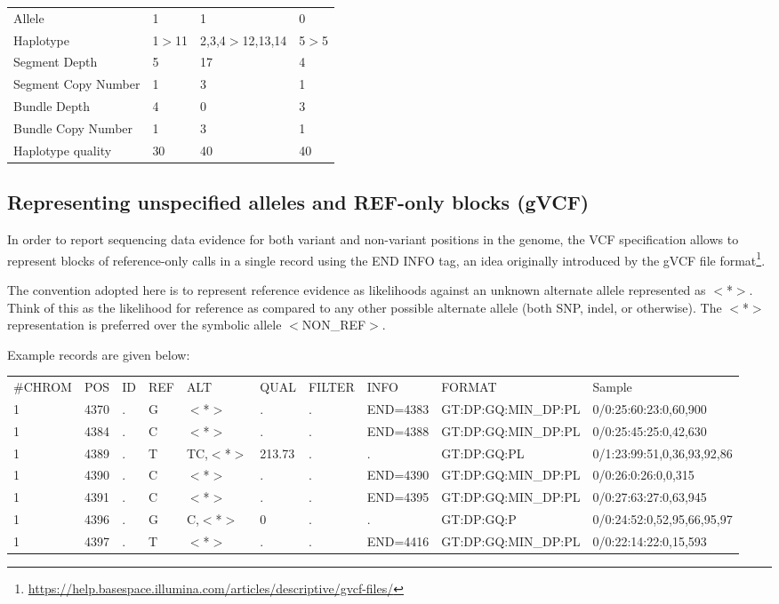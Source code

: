 \documentclass[8pt]{article}
\begin{document}
\vspace{0.3cm}
\begin{tabular}{ l l l l }
Allele & 1 & 1 & 0 \\
Haplotype & 1$>$11 & 2,3,4$>$12,13,14 &	5$>$5 \\
Segment Depth & 5 & 17 & 4 \\
Segment Copy Number	& 1 & 3	& 1 \\
Bundle Depth & 4 & 0 & 3 \\
Bundle Copy Number & 1 & 3 & 1 \\
Haplotype quality & 30 & 40 & 40 \\
\end{tabular}

\pagebreak
\subsection{Representing unspecified alleles and REF-only blocks (gVCF)}
In order to report sequencing data evidence for both variant and non-variant positions in the genome, the VCF specification allows to represent blocks of reference-only calls in a single record using the END INFO tag, an idea originally introduced by the gVCF file format\footnote{\url{https://help.basespace.illumina.com/articles/descriptive/gvcf-files/}}.

The convention adopted here is to represent reference evidence as likelihoods against an unknown alternate allele represented as $<$*$>$.
Think of this as the likelihood for reference as compared to any other possible alternate allele (both SNP, indel, or otherwise).
The $<$*$>$ representation is preferred over the symbolic allele $<$NON\_REF$>$.

Example records are given below:
\scriptsize
\begin{flushleft}
\begin{tabular}{ l l l l l l l l l l }
\#CHROM & POS & ID & REF & ALT & QUAL & FILTER & INFO & FORMAT & Sample \\
1 & 4370 & . & G & $<$*$>$ & . & . & END=4383 & GT:DP:GQ:MIN\_DP:PL & 0/0:25:60:23:0,60,900 \\
1 & 4384 & . & C & $<$*$>$ & . & . & END=4388 & GT:DP:GQ:MIN\_DP:PL & 0/0:25:45:25:0,42,630 \\
1 & 4389 & . & T & TC,$<$*$>$ & 213.73 & . & . & GT:DP:GQ:PL & 0/1:23:99:51,0,36,93,92,86 \\
1 & 4390 & . & C & $<$*$>$ & . & . & END=4390 & GT:DP:GQ:MIN\_DP:PL & 0/0:26:0:26:0,0,315 \\
1 & 4391 & . & C & $<$*$>$ & . & . & END=4395 & GT:DP:GQ:MIN\_DP:PL & 0/0:27:63:27:0,63,945 \\
1 & 4396 & . & G & C,$<$*$>$ & 0 & . & . & GT:DP:GQ:P & 0/0:24:52:0,52,95,66,95,97 \\
1 & 4397 & . & T & $<$*$>$ & . & . & END=4416 & GT:DP:GQ:MIN\_DP:PL & 0/0:22:14:22:0,15,593 \\
\end{tabular}
\end{flushleft}
\normalsize
\end{document}
